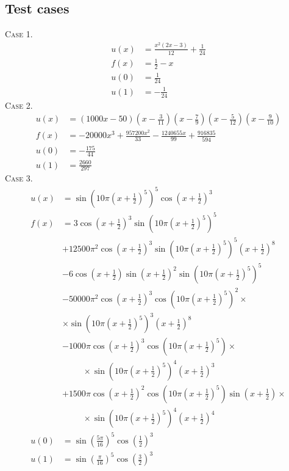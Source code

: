 \documentclass[a4paper]{article}
\numberwithin{equation}{section}
\begin{document}
\subsection{Test cases}
\textsc{Case 1.}
\begin{align}
u(x)&=\frac{x^2\left(2x-3\right)}{12}+\frac{1}{24}\\
f(x)&=\frac{1}{2}-x\\
u(0)&=\frac{1}{24}\\
u(1)&=-\frac{1}{24}
\end{align}
\textsc{Case 2.}
\begin{align}
u(x) &= \left( {1000x - 50} \right)\left( {x - \frac{3}{{11}}} \right)\left( {x - \frac{7}{9}} \right)\left( {x - \frac{5}{{12}}} \right)\left( {x - \frac{9}{{10}}} \right)\\
f(x) &=  - 20000{x^3} + \frac{{957200{x^2}}}{{33}} - \frac{{1240655x}}{{99}} + \frac{{916835}}{{594}}\\
u(0) &=  - \frac{{175}}{{44}}\\
u(1) &= \frac{{2660}}{{297}}
\end{align}
\textsc{Case 3.}
\begin{align}
u(x) &= \sin {\left( {10\pi {{\left( {x + \frac{1}{2}} \right)}^5}} \right)^5}\cos {\left( {x + \frac{1}{2}} \right)^3}\\
f(x) &= 3\cos {\left( {x + \frac{1}{2}} \right)^3}\sin {\left( {10\pi {{\left( {x + \frac{1}{2}} \right)}^5}} \right)^5}\\
& + 12500{\pi ^2}\cos {\left( {x + \frac{1}{2}} \right)^3}\sin {\left( {10\pi {{\left( {x + \frac{1}{2}} \right)}^5}} \right)^5}{\left( {x + \frac{1}{2}} \right)^8}\\
& - 6\cos \left( {x + \frac{1}{2}} \right)\sin {\left( {x + \frac{1}{2}} \right)^2}\sin {\left( {10\pi {{\left( {x + \frac{1}{2}} \right)}^5}} \right)^5}\\
& - 50000{\pi ^2}\cos {\left( {x + \frac{1}{2}} \right)^3}\cos {\left( {10\pi {{\left( {x + \frac{1}{2}} \right)}^5}} \right)^2} \times \\
& \times \sin {\left( {10\pi {{\left( {x + \frac{1}{2}} \right)}^5}} \right)^3}{\left( {x + \frac{1}{2}} \right)^8}\\
& - 1000\pi \cos {\left( {x + \frac{1}{2}} \right)^3}\cos \left( {10\pi {{\left( {x + \frac{1}{2}} \right)}^5}} \right) \times \\
&\hspace{1cm} \times \sin {\left( {10\pi {{\left( {x + \frac{1}{2}} \right)}^5}} \right)^4}{\left( {x + \frac{1}{2}} \right)^3}\\
& + 1500\pi \cos {\left( {x + \frac{1}{2}} \right)^2}\cos \left( {10\pi {{\left( {x + \frac{1}{2}} \right)}^5}} \right)\sin \left( {x + \frac{1}{2}} \right) \times \\
& \hspace{1cm}\times \sin {\left( {10\pi {{\left( {x + \frac{1}{2}} \right)}^5}} \right)^4}{\left( {x + \frac{1}{2}} \right)^4}\\
u(0) &= \sin {\left( {\frac{{5\pi }}{{16}}} \right)^5}\cos {\left( {\frac{1}{2}} \right)^3}\\
u(1) &= \sin {\left( {\frac{\pi }{{16}}} \right)^5}\cos {\left( {\frac{3}{2}} \right)^3}
\end{align}
\end{document}
